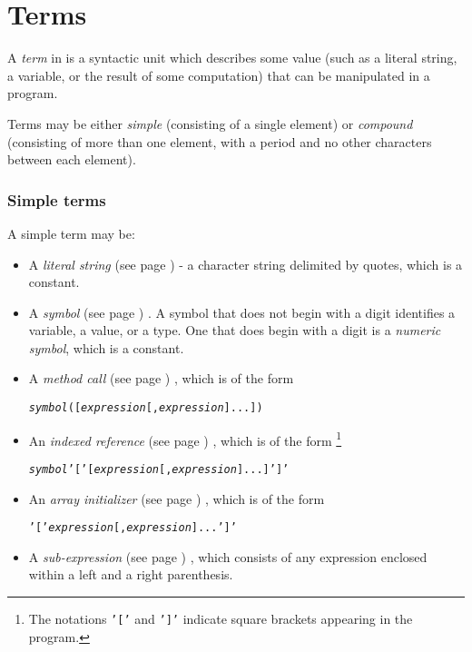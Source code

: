 \chapter{Terms}\label{refterms}
 
A \emph{term} in \nr{} is a syntactic unit which describes some
value (such as a literal string, a variable, or the result of some
computation) that can be manipulated in a \nr{} program.
 
Terms may be either \emph{simple} (consisting of a single element) or
\emph{compound} (consisting of more than one element, with a period
and no other characters between each element).
\subsection{Simple terms}\label{refsimterm}
 A simple term may be:
\begin{itemize}
\item A  \emph{literal string} (see page \pageref{refxstr})  - a character string
delimited by quotes, which is a constant.
\item A  \emph{symbol} (see page \pageref{refsyms}) .
A symbol that does not begin with a digit identifies a variable, a
value, or a type.
One that does begin with a digit is a \emph{numeric symbol}, which is
a constant.
\item A  \emph{method call} (see page \pageref{refmethcon}) , which is of the form
\begin{alltt}
\emph{symbol}([\emph{expression}[,\emph{expression}]...])
\end{alltt}
\item An  \emph{indexed reference} (see page \pageref{refinstr}) , which is of the form
\footnote{
The notations \texttt{'['} and \texttt{']'}
indicate square brackets appearing in the \nr{} program.
}
\begin{alltt}
\emph{symbol}\texttt{'['}[\emph{expression}[,\emph{expression}]...]\texttt{']'}
\end{alltt}
\item An  \emph{array initializer} (see page \pageref{refarrin}) , which is of the form
\begin{alltt}
\texttt{'['}\emph{expression}[,\emph{expression}]...\texttt{']'}
\end{alltt}
\item A  \emph{sub-expression} (see page \pageref{refpreced}) , which consists of any
expression enclosed within a left and a right parenthesis.
\end{itemize}

